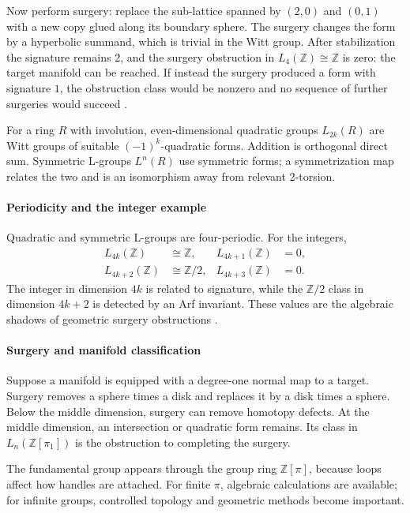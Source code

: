 Now perform surgery: replace the sub-lattice spanned by $(2,0)$ and $(0,1)$ with a new copy glued along its boundary sphere. The surgery changes the form by a hyperbolic summand, which is trivial in the Witt group. After stabilization the signature remains $2$, and the surgery obstruction in $L_4(\mathbb{Z})\cong\mathbb{Z}$ is zero: the target manifold can be reached. If instead the surgery produced a form with signature $1$, the obstruction class would be nonzero and no sequence of further surgeries would succeed \cite{l_theory_ref1,l_theory_ref2}.

For a ring $R$ with involution, even-dimensional quadratic groups $L_{2k}(R)$ are Witt groups of suitable $(-1)^k$-quadratic forms. Addition is orthogonal direct sum. Symmetric L-groups $L^n(R)$ use symmetric forms; a symmetrization map relates the two and is an isomorphism away from relevant 2-torsion.

\paragraph{Periodicity and the integer example}
Quadratic and symmetric L-groups are four-periodic. For the integers,
\[
\begin{aligned}
L_{4k}(\mathbb Z)&\cong\mathbb Z, &
L_{4k+1}(\mathbb Z)&=0,\\
L_{4k+2}(\mathbb Z)&\cong\mathbb Z/2, &
L_{4k+3}(\mathbb Z)&=0.
\end{aligned}
\]
The integer in dimension $4k$ is related to signature, while the $\mathbb Z/2$ class in dimension $4k+2$ is detected by an Arf invariant. These values are the algebraic shadows of geometric surgery obstructions \cite{l_theory_ref2}.

\paragraph{Surgery and manifold classification}
Suppose a manifold is equipped with a degree-one normal map to a target. Surgery removes a sphere times a disk and replaces it by a disk times a sphere. Below the middle dimension, surgery can remove homotopy defects. At the middle dimension, an intersection or quadratic form remains. Its class in $L_n(\mathbb Z[\pi_1])$ is the obstruction to completing the surgery.

The fundamental group appears through the group ring $\mathbb Z[\pi]$, because loops affect how handles are attached. For finite $\pi$, algebraic calculations are available; for infinite groups, controlled topology and geometric methods become important.

